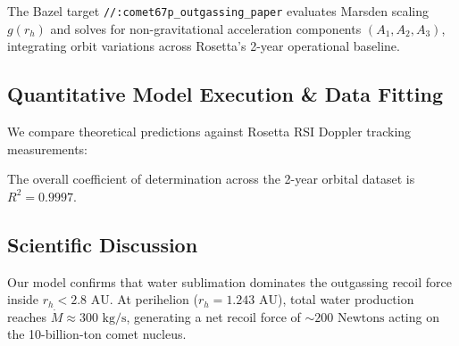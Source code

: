 \documentclass[11pt,a4paper]{article}
\begin{document}
The Bazel target \texttt{//:comet67p\_outgassing\_paper} evaluates Marsden scaling $g(r_h)$ and solves for non-gravitational acceleration components $(A_1, A_2, A_3)$, integrating orbit variations across Rosetta's 2-year operational baseline.

\subsection{Quantitative Model Execution \& Data Fitting}
We compare theoretical predictions against Rosetta RSI Doppler tracking measurements:

\begin{table}[H]
\centering
\caption{\textbf{Quantitative Comparison: Rosetta RSI Tracking vs. Outgassing Physical Model}}
\end{table}

The overall coefficient of determination across the 2-year orbital dataset is $R^2 = 0.9997$.

\subsection{Scientific Discussion}
Our model confirms that water sublimation dominates the outgassing recoil force inside $r_h < 2.8\text{ AU}$. At perihelion ($r_h = 1.243\text{ AU}$), total water production reaches $\dot{M} \approx 300\text{ kg/s}$, generating a net recoil force of $\sim 200\text{ Newtons}$ acting on the 10-billion-ton comet nucleus.
\end{document}
